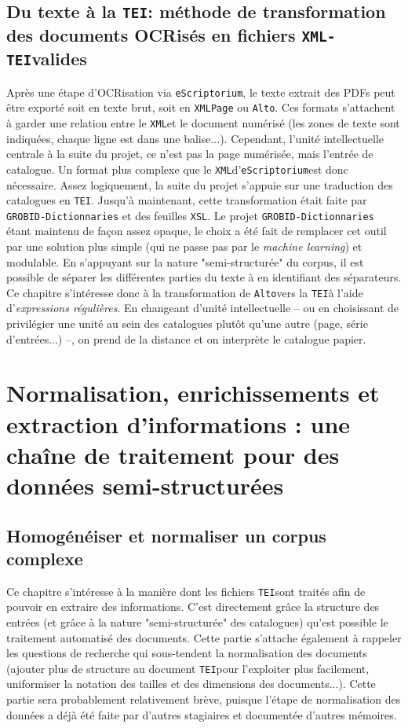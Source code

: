 \documentclass[a4paper, 12pt, twoside]{book}
\newcommand{\alto}{\texttt{Alto}}
\newcommand{\escr}{\texttt{eScriptorium}}
\newcommand{\rgx}{\textit{expressions régulières}}
\newcommand{\tei}{\texttt{TEI}}
\newcommand{\xml}{\texttt{XML}}
\newcommand{\xmltei}{\texttt{XML-TEI}}
\newcommand{\xsl}{\texttt{XSL}}
\begin{document}
\chapter{Du texte à la \tei : méthode de transformation des documents OCRisés en fichiers \xmltei valides}
Après une étape d'OCRisation via \escr, le texte extrait des PDFs peut être exporté soit en texte brut, soit en \xml \texttt{Page} ou \alto. Ces formats s'attachent à garder une relation entre le \xml et le document numérisé (les zones de texte sont indiquées, chaque ligne est dans une balise...). Cependant, l'unité intellectuelle centrale à la suite du projet, ce n'est pas la page numérisée, mais l'entrée de catalogue. Un format plus complexe que le \xml d'\escr est donc nécessaire. Assez logiquement, la suite du projet s'appuie sur une traduction des catalogues en \tei. Jusqu'à maintenant, cette transformation était faite par \texttt{GROBID-Dictionnaries} et des feuilles \xsl. Le projet \texttt{GROBID-Dictionnaries} étant maintenu de façon assez opaque, le choix a été fait de remplacer cet outil par une solution plus simple (qui ne passe pas par le \textit{machine learning}) et modulable. En s'appuyant sur la nature "semi-structurée" du corpus, il est possible de séparer les différentes parties du texte à en identifiant des séparateurs. Ce chapitre s'intéresse donc à la transformation de \alto vers la \tei à l'aide d'\rgx. En changeant d'unité intellectuelle -- ou en choisissant de privilégier une unité au sein des catalogues plutôt qu'une autre (page, série d'entrées...) --, on prend de la distance et on interprète le catalogue papier.




\part{Normalisation, enrichissements et extraction d'informations : une chaîne de traitement pour des données semi-structurées}
\chapter{Homogénéiser et normaliser un corpus complexe}
Ce chapitre s'intéresse à la manière dont les fichiers \tei sont traités afin de pouvoir en extraire des informations. C'est directement grâce la structure des entrées (et grâce à la nature "semi-structurée" des catalogues) qu'est possible le traitement automatisé des documents. Cette partie s'attache également à rappeler les questions de recherche qui sous-tendent la normalisation des documents (ajouter plus de structure au document \tei pour l'exploiter plus facilement, uniformiser la notation des tailles et des dimensions des documents...). Cette partie sera probablement relativement brève, puisque l'étape de normalisation des données a déjà été faite par d'autres stagiaires et documentée d'autres mémoires.
\end{document}
